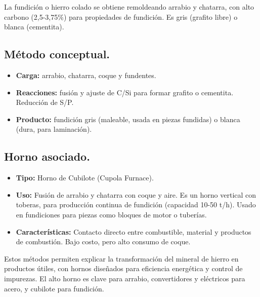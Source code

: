 \documentclass[12pt,a4paper]{article}
\begin{document}
La fundición o hierro colado se obtiene remoldeando arrabio y chatarra, con alto carbono (2,5-3,75\%) para propiedades de fundición. Es gris (grafito libre) o blanca (cementita).

\subsection{Método conceptual.}

\begin{itemize}
    \item \textbf{Carga:} arrabio, chatarra, coque y fundentes.
    \item \textbf{Reacciones:} fusión y ajuste de C/Si para formar grafito o cementita. Reducción de S/P.
    \item \textbf{Producto:} fundición gris (maleable, usada en piezas fundidas) o blanca (dura, para laminación).
\end{itemize}

\subsection{Horno asociado.}

\begin{itemize}
    \item \textbf{Tipo:} Horno de Cubilote (Cupola Furnace).
    \item \textbf{Uso:} Fusión de arrabio y chatarra con coque y aire. Es un horno vertical con toberas, para producción continua de fundición (capacidad 10-50 t/h). Usado en fundiciones para piezas como bloques de motor o tuberías.
    \item \textbf{Características:} Contacto directo entre combustible, material y productos de combustión. Bajo costo, pero alto consumo de coque.
\end{itemize}

\begin{table}
    \caption{Tipos de Fundición}
\end{table}

Estos métodos permiten explicar la transformación del mineral de hierro en productos útiles, con hornos diseñados para eficiencia energética y control de impurezas. El alto horno es clave para arrabio, convertidores y eléctricos para acero, y cubilote para fundición.
\end{document}
